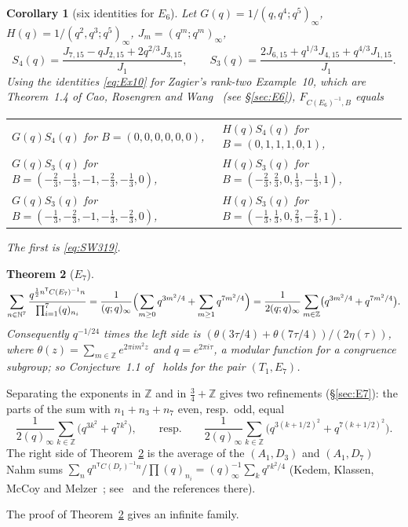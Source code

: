 \documentclass[11pt]{amsart}
\newtheorem{theorem}{Theorem}[section]
\newtheorem{corollary}[theorem]{Corollary}
\theoremstyle{definition}
\numberwithin{equation}{section}
\newcommand{\Z}{\mathbb{Z}}
\newcommand{\N}{\mathbb{N}}
\newcommand{\T}{\mathsf T}
\begin{document}
\begin{corollary}[six identities for $E_6$]\label{cor:E6}
Let $G(q)=1/(q,q^4;q^5)_\infty$, $H(q)=1/(q^2,q^3;q^5)_\infty$, $J_m=(q^m;q^m)_\infty$,
\[
S_4(q)=\frac{J_{7,15}-qJ_{2,15}+2q^{2/3}J_{3,15}}{J_1},\qquad
S_3(q)=\frac{2J_{6,15}+q^{1/3}J_{4,15}+q^{4/3}J_{1,15}}{J_1}.
\]
Using the identities \eqref{eq:Ex10} for Zagier's rank-two Example~10, which are
Theorem~1.4 of Cao, Rosengren and Wang~\cite{CRW} (see §\ref{sec:E6}), $F_{C(E_6)^{-1},B}$ equals
\begin{center}
\begin{tabular}{ll}
$G(q)S_4(q)$ for $B=(0,0,0,0,0,0)$, & $H(q)S_4(q)$ for $B=(0,1,1,1,0,1)$,\\
$G(q)S_3(q)$ for $B=(-\frac23,-\frac13,-1,-\frac23,-\frac13,0)$, & $H(q)S_3(q)$ for $B=(-\frac23,\frac23,0,\frac13,-\frac13,1)$,\\
$G(q)S_3(q)$ for $B=(-\frac13,-\frac23,-1,-\frac13,-\frac23,0)$, & $H(q)S_3(q)$ for $B=(-\frac13,\frac13,0,\frac23,-\frac23,1)$.
\end{tabular}
\end{center}
The first is \eqref{eq:SW319}.
\end{corollary}

\begin{theorem}[$E_7$]\label{thm:E7}
\[
\sum_{n\in\N^7}\frac{q^{\frac12n^{\T}C(E_7)^{-1}n}}{\prod_{i=1}^7(q)_{n_i}}
=\frac1{(q;q)_\infty}\Bigl(\sum_{m\ge0}q^{3m^2/4}+\sum_{m\ge1}q^{7m^2/4}\Bigr)
=\frac1{2(q;q)_\infty}\sum_{m\in\Z}\bigl(q^{3m^2/4}+q^{7m^2/4}\bigr).
\]
Consequently $q^{-1/24}$ times the left side is $(\theta(3\tau/4)+\theta(7\tau/4))/(2\eta(\tau))$, where
$\theta(z)=\sum_{m\in\Z}e^{2\pi im^2z}$ and $q=e^{2\pi i\tau}$, a modular function for a congruence
subgroup; so Conjecture~1.1 of~\cite{SW} holds for the pair $(T_1,E_7)$.
\end{theorem}

Separating the exponents in $\Z$ and in $\frac34+\Z$ gives two refinements (§\ref{sec:E7}): the parts
of the sum with $n_1+n_3+n_7$ even, resp.\ odd, equal
\[
\frac1{2(q)_\infty}\sum_{k\in\Z}\bigl(q^{3k^2}+q^{7k^2}\bigr),\qquad\text{resp.}\qquad
\frac1{2(q)_\infty}\sum_{k\in\Z}\bigl(q^{3(k+1/2)^2}+q^{7(k+1/2)^2}\bigr).
\] The right side of
Theorem~\ref{thm:E7} is the average of the $(A_1,D_3)$ and $(A_1,D_7)$ Nahm sums
$\sum_nq^{n^{\T}C(D_r)^{-1}n}/\prod(q)_{n_i}=(q)_\infty^{-1}\sum_kq^{rk^2/4}$
(Kedem, Klassen, McCoy and Melzer~\cite{KKMM1}; see~\cite[Theorem~1.2]{WW-Dk} and the references
there).

The proof of Theorem~\ref{thm:E7} gives an infinite family.
\end{document}
